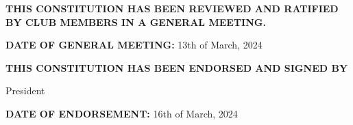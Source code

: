 \textbf{THIS CONSTITUTION HAS BEEN REVIEWED AND RATIFIED BY CLUB MEMBERS IN A GENERAL MEETING.}

\vspace{0.5cm}
\textbf{DATE OF GENERAL MEETING:} 13th of March, 2024

\vspace{0.5cm}
\textbf{THIS CONSTITUTION HAS BEEN ENDORSED AND SIGNED BY}

\signature{David Maslov}{President}

\vspace{0.5cm}
\textbf{DATE OF ENDORSEMENT:} 16th of March, 2024
